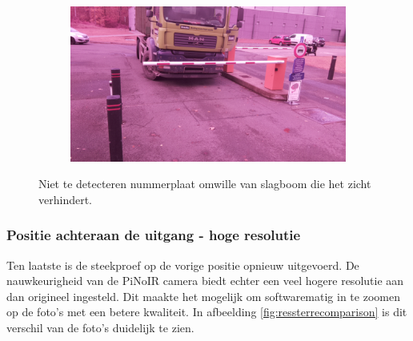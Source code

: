 \begin{figure}[h!]
	\centering
	\begin{subfigure}[b]{0.99\linewidth}
		\includegraphics[width=\linewidth]{img/sterachter/sterachter3.jpg}
	\end{subfigure}
	\caption{Niet te detecteren nummerplaat omwille van slagboom die het zicht verhindert.}
	\label{fig:slagboomster}
\end{figure}

\subsubsection{Positie achteraan de uitgang - hoge resolutie}
Ten laatste is de steekproef op de vorige positie opnieuw uitgevoerd. De nauwkeurigheid van de PiNoIR camera biedt echter een veel hogere resolutie aan dan origineel ingesteld. Dit maakte het mogelijk om softwarematig in te zoomen op de foto's met een betere kwaliteit. In afbeelding \ref{fig:ressterrecomparison} is dit verschil van de foto's duidelijk te zien.

